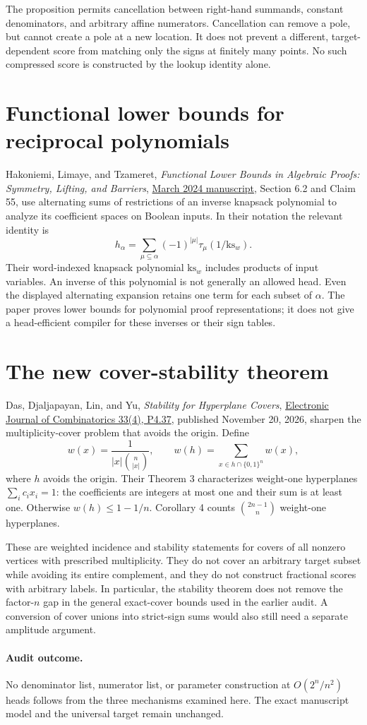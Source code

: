\documentclass[11pt]{article}
\begin{document}
The proposition permits cancellation between right-hand summands,
constant denominators, and arbitrary affine numerators. Cancellation
can remove a pole, but cannot create a pole at a new location.
It does not prevent a different, target-dependent score from matching
only the signs at finitely many points. No such compressed score is
constructed by the lookup identity alone.

\section{Functional lower bounds for reciprocal polynomials}

Hakoniemi, Limaye, and Tzameret,
\emph{Functional Lower Bounds in Algebraic Proofs: Symmetry, Lifting,
and Barriers},
\href{https://www.doc.ic.ac.uk/~itzamere/HLT-functional-23.pdf}{March 2024 manuscript},
Section 6.2 and Claim 55, use alternating sums of restrictions of an
inverse knapsack polynomial to analyze its coefficient spaces on
Boolean inputs. In their notation the relevant identity is
\[
 h_\alpha=\sum_{\mu\subseteq\alpha}(-1)^{|\mu|}
 \tau_\mu(1/\mathrm{ks}_w).
\]
Their word-indexed knapsack polynomial $\mathrm{ks}_w$ includes products
of input variables. An inverse of this polynomial is not generally an
allowed head. Even the displayed alternating expansion retains one
term for each subset of $\alpha$. The paper proves lower bounds for
polynomial proof representations; it does not give a head-efficient
compiler for these inverses or their sign tables.

\section{The new cover-stability theorem}

Das, Djaljapayan, Lin, and Yu,
\emph{Stability for Hyperplane Covers},
\href{https://www.combinatorics.org/ojs/index.php/eljc/article/download/v33i4p37/pdf}{Electronic Journal of Combinatorics 33(4), P4.37},
published November 20, 2026, sharpen the multiplicity-cover problem
that avoids the origin. Define
\[
 w(x)=\frac{1}{|x|\binom n{|x|}},\qquad
 w(h)=\sum_{x\in h\cap\{0,1\}^n}w(x),
\]
where $h$ avoids the origin. Their Theorem 3 characterizes weight-one
hyperplanes $\sum_i c_i x_i=1$: the coefficients are integers at most
one and their sum is at least one. Otherwise $w(h)\le1-1/n$.
Corollary 4 counts $\binom{2n-1}{n}$ weight-one hyperplanes.

These are weighted incidence and stability statements for covers of
all nonzero vertices with prescribed multiplicity. They do not cover
an arbitrary target subset while avoiding its entire complement, and
they do not construct fractional scores with arbitrary labels. In
particular, the stability theorem does not remove the factor-$n$ gap
in the general exact-cover bounds used in the earlier audit. A
conversion of cover unions into strict-sign sums would also still
need a separate amplitude argument.

\paragraph{Audit outcome.}
No denominator list, numerator list, or parameter construction at
$O(2^n/n^2)$ heads follows from the three mechanisms examined here.
The exact manuscript model and the universal target remain unchanged.
\end{document}
